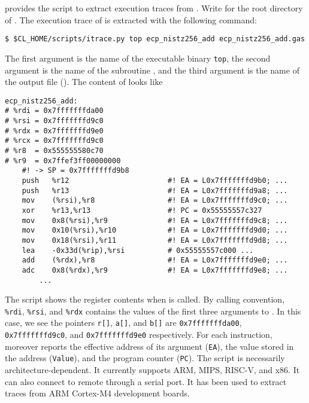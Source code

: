 \documentclass{amsproc}
\begin{document}
\cryptoline provides the \python script \itrace to extract execution
traces from \gdb. Write \cryptolinehome for the root directory of
\cryptoline. The execution trace of \nistzadd is extracted with the
following command:
\begin{verbatim}
$ $CL_HOME/scripts/itrace.py top ecp_nistz256_add ecp_nistz256_add.gas
\end{verbatim}
The first argument is the name of the executable binary \texttt{top},
the second argument is the name of the subroutine \nistzadd, and the
third argument is the name of the output file
(\nistzaddgas). The content of \nistzaddgas looks like
\begin{verbatim}
ecp_nistz256_add:
# %rdi = 0x7fffffffda00
# %rsi = 0x7fffffffd9c0
# %rdx = 0x7fffffffd9e0
# %rcx = 0x7fffffffd9c0
# %r8  = 0x555555580c70
# %r9  = 0x7ffef3ff00000000
	#! -> SP = 0x7fffffffd9b8
	push   %r12                       #! EA = L0x7fffffffd9b0; ...
	push   %r13                       #! EA = L0x7fffffffd9a8; ...
	mov    (%rsi),%r8                 #! EA = L0x7fffffffd9c0; ...
	xor    %r13,%r13                  #! PC = 0x55555557c327
	mov    0x8(%rsi),%r9              #! EA = L0x7fffffffd9c8; ...
	mov    0x10(%rsi),%r10            #! EA = L0x7fffffffd9d0; ...
	mov    0x18(%rsi),%r11            #! EA = L0x7fffffffd9d8; ...
	lea    -0x33d(%rip),%rsi          # 0x55555557c000 ...
	add    (%rdx),%r8                 #! EA = L0x7fffffffd9e0; ...
	adc    0x8(%rdx),%r9              #! EA = L0x7fffffffd9e8; ...
        ...
\end{verbatim}
The script \itrace shows the register contents when \nistzadd is
called. By calling convention, \texttt{\%rdi}, \texttt{\%rsi}, and
\texttt{\%rdx} contains the values of the first three arguments to
\nistzadd. In this case, we see the pointers \texttt{r[]},
\texttt{a[]}, and \texttt{b[]} are \texttt{0x7fffffffda00}, 
\texttt{0x7fffffffd9c0}, and \texttt{0x7fffffffd9e0}
respectively. For each instruction, \itrace moreover reports the
effective address of its argument (\texttt{EA}), the value stored in
the address (\texttt{Value}), and the program counter (\texttt{PC}). 
The \itrace script is necessarily architecture-dependent. It currently
supports ARM, MIPS, RISC-V, and x86. It can also connect to remote
\gdb through a serial port. It has been used to extract traces from
ARM Cortex-M4 development boards.
\end{document}
